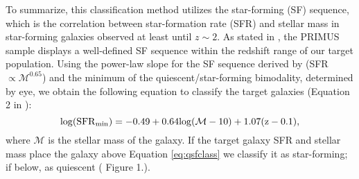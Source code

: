 \documentclass{emulateapj}
\begin{document}
To summarize, this classification method utilizes the star-forming (SF) sequence, which is the correlation between star-formation rate (SFR) and stellar mass in star-forming 
galaxies observed at least until $z \sim 2$.
As stated in \cite{Moustakas:2013aa}, the PRIMUS sample displays a well-defined SF sequence within the redshift range of our target population.
Using the power-law slope for the SF sequence derived by \cite{Salim:2007aa} (SFR $\propto \mathcal{M}^{0.65}$) and the minimum of the quiescent/star-forming bimodality, 
determined by eye, we obtain the following equation to classify the target galaxies (Equation 2 in \cite{Moustakas:2013aa}):
\begin{equation}
\label{eq:qsfclass} 
\rm{log}(\rm{SFR}_{\rm{min}}) = -0.49 + 0.64 \rm{log}(\mathcal{M} - 10) +1.07(z-0.1), 
\end{equation}
where $\mathcal{M}$ is the stellar mass of the galaxy.
If the target galaxy SFR and stellar mass place the galaxy above Equation \ref{eq:qsfclass} we classify it as star-forming; if below, as quiescent (\cite{Moustakas:2013aa} Figure 1.).
\end{document}
